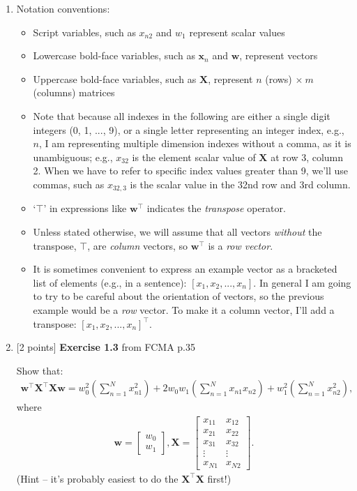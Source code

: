 \documentclass[10pt]{article}
\begin{document}
\begin{enumerate}
\item[] Notation conventions:
\begin{itemize}
\item Script variables, such as $x_{n2}$ and $w_1$ represent scalar values
\item Lowercase bold-face variables, such as $\mathbf{x}_n$ and $\mathbf{w}$, represent vectors
\item Uppercase bold-face variables, such as $\mathbf{X}$, represent $n$ (rows) $\times ~m$ (columns) matrices
\item Note that because all indexes in the following are either a single digit integers (0, 1, ..., 9), or a single letter representing an integer index, e.g., $n$, I am representing multiple dimension indexes without a comma, as it is unambiguous; e.g., $x_{32}$ is the element scalar value of $\mathbf{X}$ at row 3, column 2.  When we have to refer to specific index values greater than 9, we'll use commas, such as $x_{32,3}$ is the scalar value in the 32nd row and 3rd column.
\item `$\top$' in expressions like $\mathbf{w}^\top$ indicates the {\em transpose} operator.
\item Unless stated otherwise, we will assume that all vectors {\em without} the transpose, $\top$, are {\em column} vectors, so $\mathbf{w}^\top$ is a {\em row vector}.
\item It is sometimes convenient to express an example vector as a bracketed list of elements (e.g., in a sentence): $[x_1, x_2, ..., x_n]$.  In general I am going to try to be careful about the orientation of vectors, so the previous example would be a {\em row} vector.  To make it a column vector, I'll add a transpose: $[x_1, x_2, ..., x_n]^\top$.
\end{itemize}



\item \label{prob:3} [2 points]
{\bf Exercise 1.3} from FCMA p.35

Show that:
\begin{eqnarray*}
\mathbf{w}^\top\mathbf{X}^\top\mathbf{X}\mathbf{w} = w_0^2 \left( \sum_{n=1}^N x_{n1}^2 \right) + 2w_0w_1 \left( \sum_{n=1}^N x_{n1}x_{n2} \right) + w_1^2 \left( \sum_{n=1}^N x_{n2}^2 \right),
\end{eqnarray*}
where
\begin{eqnarray*}
\mathbf{w} = 
    \begin{bmatrix}
    w_0 \\[0.3em]
    w_1
    \end{bmatrix}
    ,
\mathbf{X} = 
    \begin{bmatrix}
    x_{11} & x_{12} \\[0.3em]
    x_{21} & x_{22} \\[0.3em]
    x_{31} & x_{32} \\[0.3em]
    \vdots & \vdots \\[0.3em]
    x_{N1} & x_{N2}
    \end{bmatrix}
    .
\end{eqnarray*}
(Hint -- it's probably easiest to do the $\mathbf{X}^\top\mathbf{X}$ first!)


\end{enumerate}
\end{document}
